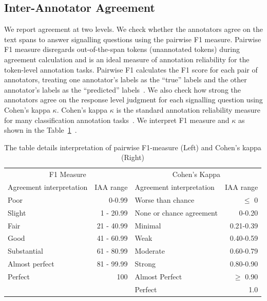 \documentclass[sn-mathphys,Numbered]{sn-jnl}%
\theoremstyle{thmstyleone}%
\theoremstyle{thmstyletwo}%
\theoremstyle{thmstylethree}%
\begin{document}
\subsection{Inter-Annotator Agreement}
\label{method:iaa}
%
We report agreement at two levels. 
We check whether the annotators agree on the text spans to answer signalling questions using the pairwise F1 measure.
Pairwise F1 measure disregards out-of-the-span tokens (unannotated tokens) during agreement calculation and is an ideal measure of annotation reliability for the token-level annotation tasks.
Pairwise F1 calculates the F1 score for each pair of annotators, treating one annotator's labels as the ``true'' labels and the other annotator's labels as the ``predicted'' labels~\cite{deleger2012building,brandsen2020creating}.
We also check how strong the annotators agree on the response level judgment for each signalling question using Cohen's kappa $\kappa$.
Cohen's kappa $\kappa$ is the standard annotation reliability measure for many classification annotation tasks~\cite{mchugh2012interrater}.
We interpret F1 measure and $\kappa$ as shown in the Table~\ref{tab:iaa_interpret}~\cite{landis1977measurement}.
%
%
%
\begin{center}
 \begin{table}[htb]
   \caption{The table details interpretation of pairwise F1-measure (Left) and Cohen's kappa (Right)}\label{tab:iaa_interpret}
 \centering
    \begin{tabular}{lr|lr}
    \toprule[1.0pt]
    \multicolumn{2}{c|}{F1 Measure} & \multicolumn{2}{c}{Cohen's Kappa}  \\ 
    Agreement interpretation & IAA range & Agreement interpretation & IAA range \\ 
    \midrule[1.0pt]
        Poor & 0-0.99 &  Worse than chance & $\leq$ 0\\ 
        Slight & 1 - 20.99 &  None or chance agreement & 0-0.20\\ 
        Fair & 21 - 40.99 &  Minimal & 0.21-0.39\\ 
        Good & 41 - 60.99 & Weak & 0.40-0.59\\ 
        Substantial & 61 - 80.99 & Moderate & 0.60-0.79 \\ 
        Almost perfect & 81 - 99.99 & Strong & 0.80-0.90 \\ 
        Perfect & 100 & Almost Perfect & $\geq$ 0.90 \\ 
         & & Perfect & 1.0 \\ 
    \bottomrule[1.0pt]
    \end{tabular}
 \end{table}   
\end{center}
%
%
%
\end{document}
